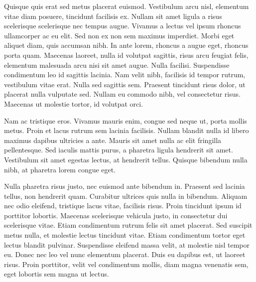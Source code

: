 \documentclass[12pt, a4paper]{article}
\begin{document}
Quisque quis erat sed metus placerat euismod. Vestibulum arcu nisl, elementum vitae diam posuere, tincidunt facilisis ex. Nullam sit amet ligula a risus scelerisque scelerisque nec tempus augue. Vivamus a lectus vel ipsum rhoncus ullamcorper ac eu elit. Sed non ex non sem maximus imperdiet. Morbi eget aliquet diam, quis accumsan nibh. In ante lorem, rhoncus a augue eget, rhoncus porta quam. Maecenas laoreet, nulla id volutpat sagittis, risus arcu feugiat felis, elementum malesuada arcu nisi sit amet augue. Nulla facilisi. Suspendisse condimentum leo id sagittis lacinia. Nam velit nibh, facilisis id tempor rutrum, vestibulum vitae erat. Nulla sed sagittis sem. Praesent tincidunt risus dolor, ut placerat nulla vulputate sed. Nullam eu commodo nibh, vel consectetur risus. Maecenas ut molestie tortor, id volutpat orci.

Nam ac tristique eros. Vivamus mauris enim, congue sed neque ut, porta mollis metus. Proin et lacus rutrum sem lacinia facilisis. Nullam blandit nulla id libero maximus dapibus ultricies a ante. Mauris sit amet nulla ac elit fringilla pellentesque. Sed iaculis mattis purus, a pharetra ligula hendrerit sit amet. Vestibulum sit amet egestas lectus, at hendrerit tellus. Quisque bibendum nulla nibh, at pharetra lorem congue eget.

Nulla pharetra risus justo, nec euismod ante bibendum in. Praesent sed lacinia tellus, non hendrerit quam. Curabitur ultrices quis nulla in bibendum. Aliquam nec odio eleifend, tristique lacus vitae, facilisis risus. Proin tincidunt ipsum id porttitor lobortis. Maecenas scelerisque vehicula justo, in consectetur dui scelerisque vitae. Etiam condimentum rutrum felis sit amet placerat. Sed suscipit metus nulla, et molestie lectus tincidunt vitae. Etiam condimentum tortor eget lectus blandit pulvinar. Suspendisse eleifend massa velit, at molestie nisl tempor eu. Donec nec leo vel nunc elementum placerat. Duis eu dapibus est, ut laoreet risus. Proin porttitor, velit vel condimentum mollis, diam magna venenatis sem, eget lobortis sem magna ut lectus. 
\end{document}
